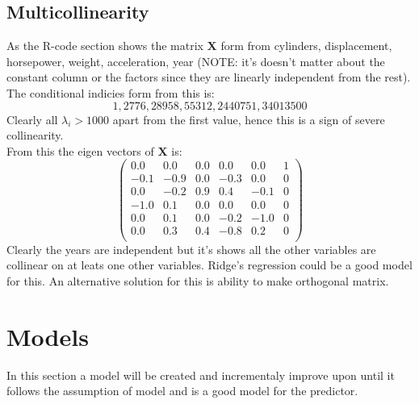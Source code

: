 \documentclass[11pt]{article} %
\begin{document}
\subsection{Multicollinearity}
As the R-code section shows the matrix $\pmb{X}$ form from cylinders, displacement, horsepower, weight, acceleration, year (NOTE: it's doesn't matter about the constant column or the factors since they are linearly independent from the rest). The conditional indicies form from this is:
$$
 1,2776,28958,55312,2440751,34013500
$$
Clearly all $\lambda_i>1000$ apart from the first value, hence this is a sign of severe collinearity.\\
From this the eigen vectors of $\pmb{X}$ is:
$$
\begin{pmatrix}
0.0&0.0&0.0&0.0&0.0&1\\
-0.1&-0.9&0.0&-0.3&0.0&0\\
0.0&-0.2&0.9&0.4&-0.1&0\\
-1.0&0.1&0.0&0.0&0.0&0\\
0.0&0.1&0.0&-0.2&-1.0&0\\
0.0&0.3&0.4&-0.8&0.2&0\\
\end{pmatrix}
$$
Clearly the years are independent but it's shows all the other variables are collinear on at leats one other variables. Ridge's regression could be a good model for this. An alternative solution for this is ability to make orthogonal matrix.

\section{Models}
In this section a model will be created and incrementaly improve upon until it follows the assumption of model and is a good model for the predictor.
\end{document}
